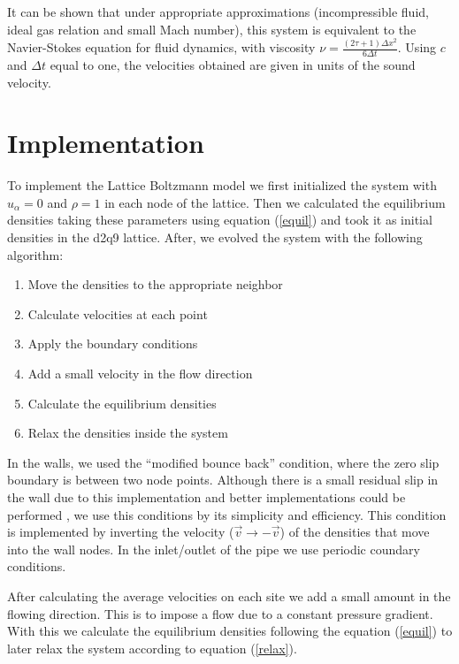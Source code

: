 \documentclass[aps,prl,reprint,groupedaddress]{revtex4-1}
\begin{document}
It can be shown \cite{ICCPBook} that under appropriate approximations (incompressible fluid, ideal gas relation and small Mach number), this system is equivalent to the Navier-Stokes equation for fluid dynamics, with viscosity $\nu = \frac{(2\tau + 1) \Delta x^2}{6 \Delta t}$. Using $c$ and $\Delta t$ equal to one, the velocities obtained are given in units of the sound velocity.

\section{Implementation}

To implement the Lattice Boltzmann model we first initialized the system with $u_{\alpha} = 0$ and $\rho = 1$ in each node of the lattice. Then we calculated the equilibrium densities taking these parameters using equation (\ref{equil}) and took it as initial densities in the d2q9 lattice. After, we evolved the system with the following algorithm:

\begin{enumerate}
\item Move the densities to the appropriate neighbor
\item Calculate velocities at each point
\item Apply the boundary conditions
\item Add a small velocity in the flow direction
\item Calculate the equilibrium densities
\item Relax the densities inside the system
\end{enumerate}

In the walls, we used the ``modified bounce back'' condition, where the zero slip boundary is between two node points. Although there is a small residual slip in the wall due to this implementation and better implementations could be performed \cite{He1997a}, we use this conditions by its simplicity and efficiency. This condition is implemented by inverting the velocity ($\vec{v} \to -\vec{v}$) of the densities that move into the wall nodes. In the inlet/outlet of the pipe we use periodic coundary conditions.

After calculating the average velocities on each site we add a small amount in the flowing direction. This is to impose a flow due to a constant pressure gradient. With this we calculate the equilibrium densities following the equation (\ref{equil}) to later relax the system according to equation (\ref{relax}).
\end{document}
